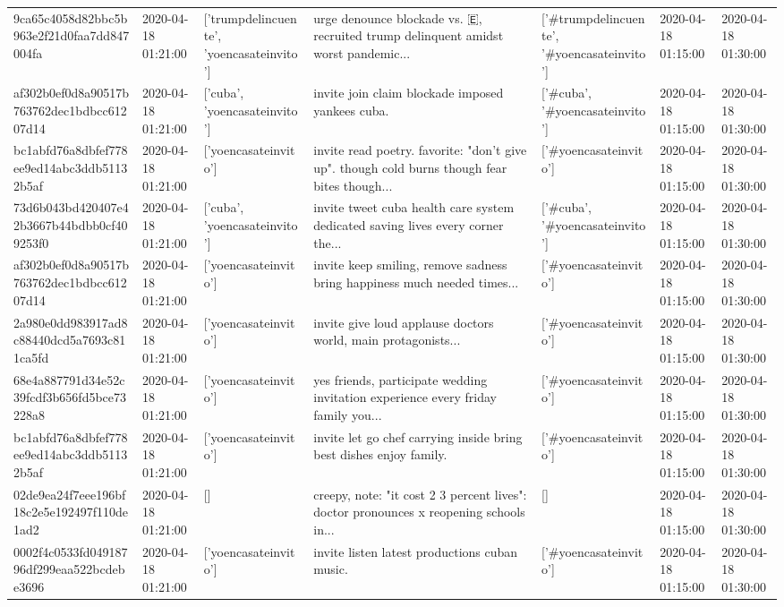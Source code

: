 \begin{tabular}{lllllll}
9ca65c4058d82bbc5b963e2f21d0faa7dd847004fa & 2020-04-18 01:21:00 & ['trumpdelincuente', 'yoencasateinvito'] & urge denounce blockade vs. 🇪, recruited trump delinquent amidst worst pandemic... & ['#trumpdelincuente', '#yoencasateinvito'] & 2020-04-18 01:15:00 & 2020-04-18 01:30:00 \\
af302b0ef0d8a90517b763762dec1bdbcc61207d14 & 2020-04-18 01:21:00 & ['cuba', 'yoencasateinvito'] & invite join claim blockade imposed yankees cuba. & ['#cuba', '#yoencasateinvito'] & 2020-04-18 01:15:00 & 2020-04-18 01:30:00 \\
bc1abfd76a8dbfef778ee9ed14abc3ddb51132b5af & 2020-04-18 01:21:00 & ['yoencasateinvito'] & invite read poetry. favorite: "don't give up". though cold burns though fear bites though... & ['#yoencasateinvito'] & 2020-04-18 01:15:00 & 2020-04-18 01:30:00 \\
73d6b043bd420407e42b3667b44bdbb0cf409253f0 & 2020-04-18 01:21:00 & ['cuba', 'yoencasateinvito'] & invite tweet cuba health care system dedicated saving lives every corner the... & ['#cuba', '#yoencasateinvito'] & 2020-04-18 01:15:00 & 2020-04-18 01:30:00 \\
af302b0ef0d8a90517b763762dec1bdbcc61207d14 & 2020-04-18 01:21:00 & ['yoencasateinvito'] & invite keep smiling, remove sadness bring happiness much needed times... & ['#yoencasateinvito'] & 2020-04-18 01:15:00 & 2020-04-18 01:30:00 \\
2a980e0dd983917ad8c88440dcd5a7693c811ca5fd & 2020-04-18 01:21:00 & ['yoencasateinvito'] & invite give loud applause doctors world, main protagonists... & ['#yoencasateinvito'] & 2020-04-18 01:15:00 & 2020-04-18 01:30:00 \\
68e4a887791d34e52c39fcdf3b656fd5bce73228a8 & 2020-04-18 01:21:00 & ['yoencasateinvito'] & yes friends, participate wedding invitation experience every friday family you... & ['#yoencasateinvito'] & 2020-04-18 01:15:00 & 2020-04-18 01:30:00 \\
bc1abfd76a8dbfef778ee9ed14abc3ddb51132b5af & 2020-04-18 01:21:00 & ['yoencasateinvito'] & invite let go chef carrying inside bring best dishes enjoy family. & ['#yoencasateinvito'] & 2020-04-18 01:15:00 & 2020-04-18 01:30:00 \\
02de9ea24f7eee196bf18c2e5e192497f110de1ad2 & 2020-04-18 01:21:00 & [] & creepy, note: "it cost 2 3 percent lives": doctor pronounces x reopening schools in... & [] & 2020-04-18 01:15:00 & 2020-04-18 01:30:00 \\
0002f4c0533fd04918796df299eaa522bcdebe3696 & 2020-04-18 01:21:00 & ['yoencasateinvito'] & invite listen latest productions cuban music. & ['#yoencasateinvito'] & 2020-04-18 01:15:00 & 2020-04-18 01:30:00 \\

\end{tabular}
